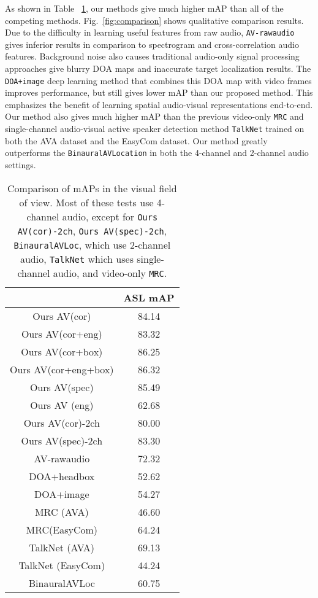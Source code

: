 \documentclass[10pt,twocolumn,letterpaper]{article}
\begin{document}
As shown in Table ~\ref{tab:comp1}, our methods give 
much higher mAP than all of the competing methods.
Fig.~\ref{fig:comparison} shows qualitative comparison results.
Due to the difficulty in learning useful features from raw audio, \texttt{AV-rawaudio} gives inferior results
in comparison to spectrogram and cross-correlation audio features. 
Background noise also causes  traditional audio-only signal processing approaches give blurry DOA maps and 
inaccurate target localization results. 
The \texttt{DOA+image} deep learning method that combines this DOA map with video frames improves performance, but
  still gives lower mAP than our proposed method. 
	This emphasizes the benefit of learning spatial audio-visual representations end-to-end.
Our method also gives much higher mAP than the previous video-only \texttt{MRC} and single-channel audio-visual active speaker detection method \texttt{TalkNet}
trained on both the AVA dataset \cite{avadataset} and the EasyCom dataset. 
Our method greatly outperforms the \texttt{BinauralAVLocation} in both the 4-channel and 2-channel audio settings.

\setlength{\tabcolsep}{1pt}
\begin{table}[tb]	
  \small
  \centering	
  \begin{tabular}{ c | c  }
    \hline
			       & ASL mAP \\ \hline
	   Ours AV(cor)         & 84.14      \\
	   Ours AV(cor+eng)     & 83.32      \\
           Ours AV(cor+box)      & 86.25       \\	   
	   Ours AV(cor+eng+box)  & 86.32       \\
	   Ours AV(spec)  & 85.49      \\
	   Ours AV (eng)         & 62.68       \\	   
	   Ours AV(cor)-2ch      & 80.00       \\
	   Ours AV(spec)-2ch     & 83.30               \\
	   \hline
	   AV-rawaudio        & 72.32       \\
	   DOA+headbox             & 52.62      \\
	   DOA+image           & 54.27      \\ 
	   MRC (AVA)           & 46.60      \\ 
	   MRC(EasyCom)        & 64.24      \\ 
	   TalkNet (AVA)       & 69.13      \\ 
	   TalkNet (EasyCom)   & 44.24      \\
	   BinauralAVLoc         & 60.75      \\
    \hline
  \end{tabular}
\caption{Comparison of mAPs in the visual field of view. Most of these tests use 4-channel audio, except
	for \texttt{Ours AV(cor)-2ch}, \texttt{Ours AV(spec)-2ch}, \texttt{BinauralAVLoc}, which use 2-channel audio, \texttt{TalkNet} which uses
	single-channel audio, and video-only \texttt{MRC}.
	}
	\label{tab:comp1}
\vspace{-10pt}	
\end{table}
\end{document}
